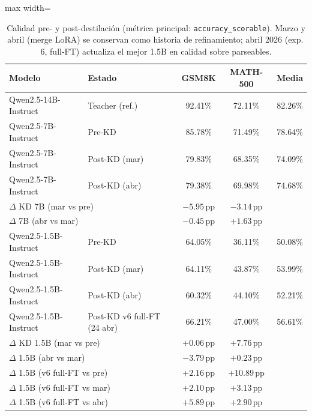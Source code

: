 \documentclass[11pt,a4paper]{article}
\begin{document}
\begin{table}[H]
\centering
\caption{Calidad pre- y post-destilaci\'on (m\'etrica principal:
         \texttt{accuracy\_scorable}).
         Marzo y abril (merge LoRA) se conservan como historia de
         refinamiento; abril 2026 (exp.\,6, full-FT) actualiza el mejor
         1.5B en calidad sobre parseables.}
\label{tab:quality-postKD}
\begin{adjustbox}{max width=\textwidth}
\begin{tabular}{llccc}
\toprule
\textbf{Modelo} & \textbf{Estado} & \textbf{GSM8K} & \textbf{MATH-500} & \textbf{Media} \\
\midrule
Qwen2.5-14B-Instruct & Teacher (ref.) & 92.41\% & 72.11\% & 82.26\% \\
\midrule
Qwen2.5-7B-Instruct  & Pre-KD   & 85.78\% & 71.49\% & 78.64\% \\
Qwen2.5-7B-Instruct  & Post-KD (mar) & 79.83\% & 68.35\% & 74.09\% \\
Qwen2.5-7B-Instruct  & Post-KD (abr) & 79.38\% & 69.98\% & 74.68\% \\
\multicolumn{2}{l}{\footnotesize $\Delta$ KD 7B (mar vs pre)}
  & $-5.95$\,pp & $-3.14$\,pp & \\
\multicolumn{2}{l}{\footnotesize $\Delta$ 7B (abr vs mar)}
  & $-0.45$\,pp & $+1.63$\,pp & \\
\midrule
Qwen2.5-1.5B-Instruct & Pre-KD  & 64.05\% & 36.11\% & 50.08\% \\
Qwen2.5-1.5B-Instruct & Post-KD (mar) & 64.11\% & 43.87\% & 53.99\% \\
Qwen2.5-1.5B-Instruct & Post-KD (abr) & 60.32\% & 44.10\% & 52.21\% \\
Qwen2.5-1.5B-Instruct & Post-KD v6 full-FT (24 abr) & 66.21\% & 47.00\% & 56.61\% \\
\multicolumn{2}{l}{\footnotesize $\Delta$ KD 1.5B (mar vs pre)}
  & $\mathbf{+0.06}$\,pp & $\mathbf{+7.76}$\,pp & \\
\multicolumn{2}{l}{\footnotesize $\Delta$ 1.5B (abr vs mar)}
  & $-3.79$\,pp & $+0.23$\,pp & \\
\multicolumn{2}{l}{\footnotesize $\Delta$ 1.5B (v6 full-FT vs pre)}
  & $\mathbf{+2.16}$\,pp & $\mathbf{+10.89}$\,pp & \\
\multicolumn{2}{l}{\footnotesize $\Delta$ 1.5B (v6 full-FT vs mar)}
  & $+2.10$\,pp & $+3.13$\,pp & \\
\multicolumn{2}{l}{\footnotesize $\Delta$ 1.5B (v6 full-FT vs abr)}
  & $+5.89$\,pp & $+2.90$\,pp & \\
\bottomrule
\end{tabular}
\end{adjustbox}
\end{table}
\end{document}
